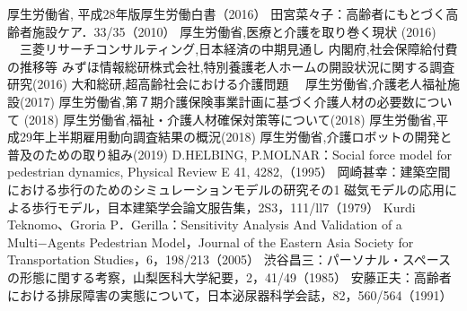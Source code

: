 \begin{thebibliography}{99}
  厚生労働省, 平成28年版厚生労働白書（2016）
  田宮菜々子：高齢者にもとづく高齢者施設ケア．33/35（2010）
  厚生労働省,医療と介護を取り巻く現状 (2016)
 　三菱リサーチコンサルティング,日本経済の中期見通し
  内閣府,社会保障給付費の推移等
  みずほ情報総研株式会社,特別養護老人ホームの開設状況に関する調査研究(2016)
  大和総研,超高齢社会における介護問題
 　厚生労働省,介護老人福祉施設(2017)
  厚生労働省,第７期介護保険事業計画に基づく介護人材の必要数について (2018)
  厚生労働省,福祉・介護人材確保対策等について(2018)
  厚生労働省,平成29年上半期雇用動向調査結果の概況(2018)
  厚生労働省,介護ロボットの開発と普及のための取り組み(2019)
  D.HELBING, P.MOLNAR：Social force model for pedestrian dynamics, Physical Review E 41, 4282,（1995）
  岡崎甚幸：建築空間における歩行のためのシミュレーションモデルの研究その1 磁気モデルの応用による歩行モデル，目本建築学会論文服告集，2S3，111/ll7（1979）
  Kurdi Teknomo、Groria P．Gerilla：Sensitivity Analysis And Validation of a Multi−Agents Pedestrian Model，Journal of the Eastern Asia Society for Transportation Studies，6，198/213（2005）
  渋谷昌三：パーソナル・スペースの形態に閏する考察，山梨医科大学紀要，2，41/49（1985）
  安藤正夫：高齢者における排尿障害の実態について，日本泌尿器科学会誌，82，560/564（1991）
\end{thebibliography}
